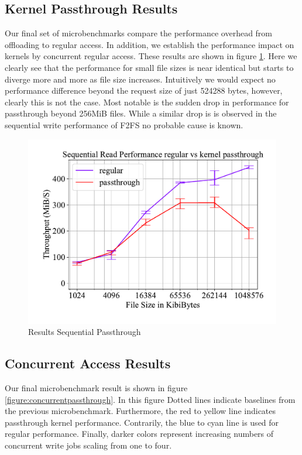 \subsection{Kernel Passthrough Results}

Our final set of microbenchmarks compare the performance overhead from
offloading to regular access. In addition, we establish the performance impact
on kernels by concurrent regular access. These results are shown in figure
\ref{figure:passthroughresults}. Here we clearly see that the performance
for small file sizes is near identical but starts to diverge more and more
as file size increases. Intuitively we would expect no performance difference
beyond the request size of just 524288 bytes, however, clearly this is not the
case. Most notable is the sudden drop in performance for passthrough beyond
256MiB files. While a similar drop is is observed in the sequential write
performance of F2FS no probable cause is known.

\begin{figure}[h]
    \centering
	\includegraphics[width=1\textwidth]{resources/images/results-passthrough.pdf}
	\caption{Results Sequential Passthrough}
    \label{figure:passthroughresults}
\end{figure}

\subsection{Concurrent Access Results}

Our final microbenchmark result is shown in figure
\ref{figure:concurrentpassthrough}. In this figure Dotted lines indicate
baselines from the previous microbenchmark. Furthermore, the red to yellow line
indicates passthrough kernel performance. Contrarily, the blue to cyan line is
used for regular performance. Finally, darker colors represent increasing
numbers of concurrent write jobs scaling from one to four.

